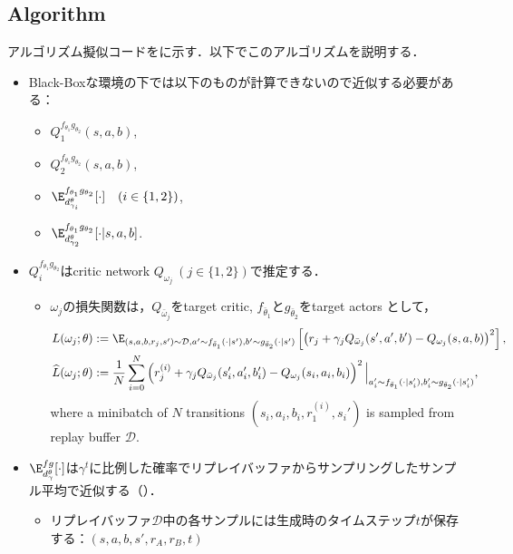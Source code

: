 \documentclass[a4paper,10pt,dvipdfmx]{jsarticle}
\begin{document}
\subsection{Algorithm}

アルゴリズム擬似コードをに示す．以下でこのアルゴリズムを説明する．

\begin{itemize}
    \item Black-Boxな環境の下では以下のものが計算できないので近似する必要がある：
    \begin{itemize}
        \item $Q_1^{f_{\theta_1}g_{\theta_2}}(s,a,b)$,
        \item $Q_2^{f_{\theta_1}g_{\theta_2}}(s,a,b)$,
        \item $\E_{d_{\gamma_i}^\theta}^{f_{\theta_1}g_{\theta_2}}[\cdot]\quad (i\in\{1,2\})$,
        \item $\E_{d_{\gamma_2}^\theta}^{f_{\theta_1}g_{\theta_2}}[\cdot|s,a,b]$.
    \end{itemize}
    \item $Q_i^{f_{\theta_1}g_{\theta_2}}$はcritic network $Q_{\omega_j}~(j\in\{1,2\})$で推定する．
    \begin{itemize}
        \item $\omega_j$の損失関数は，$Q_{\bar{\omega}_j}$をtarget critic, $f_{\bar{\theta}_1}$と$g_{\bar{\theta}_2}$をtarget actors として，
        \begin{align}
            &L(\omega_j;\theta):=\E_{(s,a,b,r_j,s')\sim\mathcal{D},a'\sim f_{\bar{\theta}_1}(\cdot|s'),b'\sim g_{\bar{\theta}_2}(\cdot|s')}\left[\left(r_j+\gamma_jQ_{\bar{\omega}_j}(s',a',b') - Q_{\omega_j}(s,a,b)\right)^2\right],\\
            &\widehat{L}(\omega_j;\theta):=\dfrac{1}{N}\sum_{i=0}^N\left(r_j^{(i)}+\gamma_jQ_{\bar{\omega}_j}(s_i',a_i',b_i') - Q_{\omega_j}(s_i,a_i,b_i)\right)^2\Big|_{a_i'\sim f_{\bar{\theta}_1}(\cdot|s_i'),b_i'\sim g_{\bar{\theta}_2}(\cdot|s_i')},
        \end{align}
        where a minibatch of $N$ transitions $(s_i,a_i,b_i,r_1^{(i)},s_i')$ is sampled from replay buffer $\mathcal{D}$.
    \end{itemize}
    \item $\E_{d_\gamma^\theta}^{fg}[\cdot]$は$\gamma^t$に比例した確率でリプレイバッファからサンプリングしたサンプル平均で近似する（）．
    \begin{itemize}
        \item リプレイバッファ$\mathcal{D}$中の各サンプルには生成時のタイムステップ$t$が保存する：$(s,a,b,s',r_A,r_B,t)$

\end{itemize}
\end{itemize}
\end{document}
